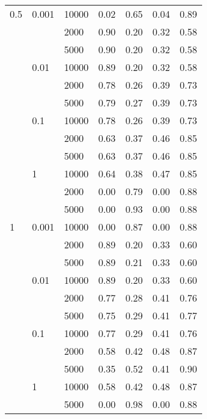 \begin{tabular}{lllrrrr}
0.5 & 0.001 & 10000 &       0.02 &       0.65 &       0.04 &       0.89 \\
      &       & 2000 &       0.90 &       0.20 &       0.32 &       0.58 \\
      &       & 5000 &       0.90 &       0.20 &       0.32 &       0.58 \\
      & 0.01 & 10000 &       0.89 &       0.20 &       0.32 &       0.58 \\
      &       & 2000 &       0.78 &       0.26 &       0.39 &       0.73 \\
      &       & 5000 &       0.79 &       0.27 &       0.39 &       0.73 \\
      & 0.1 & 10000 &       0.78 &       0.26 &       0.39 &       0.73 \\
      &       & 2000 &       0.63 &       0.37 &       0.46 &       0.85 \\
      &       & 5000 &       0.63 &       0.37 &       0.46 &       0.85 \\
      & 1 & 10000 &       0.64 &       0.38 &       0.47 &       0.85 \\
      &       & 2000 &       0.00 &       0.79 &       0.00 &       0.88 \\
      &       & 5000 &       0.00 &       0.93 &       0.00 &       0.88 \\
1 & 0.001 & 10000 &       0.00 &       0.87 &       0.00 &       0.88 \\
      &       & 2000 &       0.89 &       0.20 &       0.33 &       0.60 \\
      &       & 5000 &       0.89 &       0.21 &       0.33 &       0.60 \\
      & 0.01 & 10000 &       0.89 &       0.20 &       0.33 &       0.60 \\
      &       & 2000 &       0.77 &       0.28 &       0.41 &       0.76 \\
      &       & 5000 &       0.75 &       0.29 &       0.41 &       0.77 \\
      & 0.1 & 10000 &       0.77 &       0.29 &       0.41 &       0.76 \\
      &       & 2000 &       0.58 &       0.42 &       0.48 &       0.87 \\
      &       & 5000 &       0.35 &       0.52 &       0.41 &       0.90 \\
      & 1 & 10000 &       0.58 &       0.42 &       0.48 &       0.87 \\
      &       & 5000 &       0.00 &       0.98 &       0.00 &       0.88 \\

\end{tabular}

